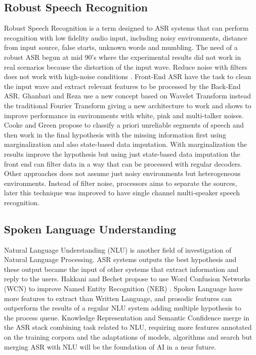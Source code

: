 \subsection{Robust Speech Recognition}
Robust Speech Recognition is a term designed to ASR systems that can perform recognition with low fidelity audio input, including noisy environments, distance from input source, false starts, unknown words and mumbling. The need of a robust ASR begun at mid 90's where the experimental results did not work in real scenarios because the distortion of the input wave. Reduce noise with filters does not work with high-noise conditions \cite{Barker2005DecodingSources}. Front-End ASR have the task to clean the input wave and extract relevant features to be processed by the Back-End ASR. Ghanbari and Reza use a new concept based on Wavelet Transform instead the traditional Fourier Transform giving a new architecture to work and shows to improve performance in environments with white, pink and multi-talker noises\cite{Ghanbari2006APackets}. Cooke and Green propose to classify a priori unreliable segments of speech and then work in the final hypothesis with the missing information first using marginalization and also state-based data imputation. With marginalization the results improve the hypothesis but using just state-based data imputation the front end can filter data in a way that can be processed with regular decoders\cite{Cooke2001RobustData}.  Other approaches does not assume just noisy environments but heterogeneous environments. Instead of filter noise, processors aims to separate the sources\cite{Barker2005DecodingSources}, later this technique was improved to have single channel multi-speaker speech recognition\cite{Rennie2010Single-ChannelRecognition}.
\subsection{Spoken Language Understanding}
Natural Language Understanding (NLU) is another field of investigation of Natural Language Processing. ASR systems outputs the best hypothesis and these output became the input of other systems that extract information and reply to the users. Hakkani and Bechet propose to use Word Confusion Networks (WCN) to improve Named Entity Recognition (NER) \cite{Hakkani-Tur2006BeyondUnderstanding}. Spoken Language have more features to extract than Written Language, and prosodic features can outperform the results of a regular NLU system adding multiple hypothesis to the process queue\cite{DeMori2008SpokenUnderstanding}. Knowledge Representation and Semantic Confidence merge in the ASR stack combining task related to NLU, requiring more features annotated on the training corpora \cite{Baker2009DevelopmentsEducation} and the adaptations of models, algorithms and search \cite{Baker2009UpdatedEducation} but merging ASR with NLU will be the foundation of AI in a near future.
